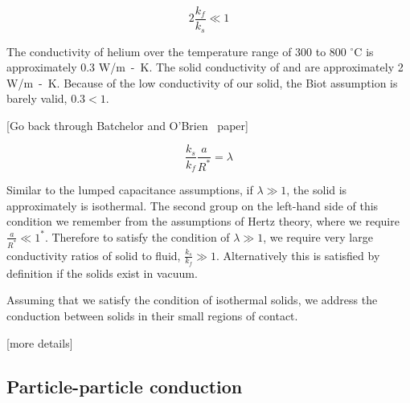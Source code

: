 \begin{equation}
	2 \frac{k_f}{k_s} \ll 1
\end{equation}

The conductivity of helium over the temperature range of 300 to 800 $^\circ$C is approximately 0.3 \si{W/m-K}. The solid conductivity of \lit and \lis are approximately 2 \si{W/m-K}. Because of the low conductivity of our solid, the Biot assumption is barely valid, $0.3 < 1$. 


































[Go back through Batchelor and O'Brien~\cite{Batchelor1977} paper]

\begin{equation}
	\frac{ k_s }{ k_f } \frac{a}{R^*} = \lambda
\end{equation}

Similar to the lumped capacitance assumptions, if $\lambda \gg 1$, the solid is approximately is isothermal. The second group on the left-hand side of this condition we remember from the assumptions of Hertz theory, where we require $\frac{a}{R^*} \ll 1^*$. Therefore to satisfy the condition of $\lambda \gg 1$, we require very large conductivity ratios of solid to fluid, $\frac{k_s}{k_f} \gg 1$. Alternatively this is satisfied by definition if the solids exist in vacuum.

Assuming that we satisfy the condition of isothermal solids, we address the conduction between solids in their small regions of contact.

[more details]










\subsection{Particle-particle conduction}

